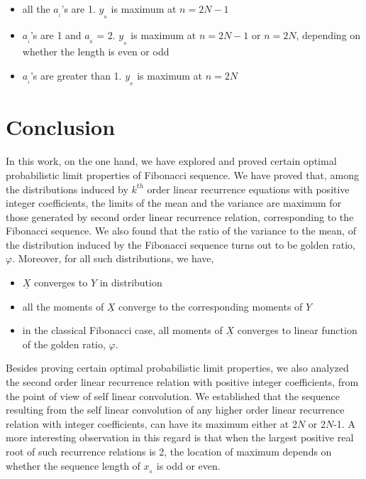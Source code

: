 \begin{multicols}{2}
\begin{itemize}
\item all the $a_{_i}$'s are 1. $y_{_n}$ is maximum at $n = 2N-1$
\item $a_{_i}$'s are 1 and $a_{_0}$ = 2. $y_{_n}$ is maximum at $n = 2N-1$ or $n = 2N$, depending on whether the length is even or odd
\item $a_{_i}$'s are greater than 1. $y_{_n}$ is maximum at $n = 2N$
\end{itemize}

\vspace{-.3cm}

\section{Conclusion}\label{section-20}
In this work, on the one hand, we have explored and proved certain optimal probabilistic limit properties of Fibonacci sequence. We have proved that, among the distributions induced by $k^{th}$ order linear recurrence equations with positive integer coefficients, the limits of the mean and the variance are maximum for those generated by second order linear recurrence relation, corresponding to the Fibonacci sequence. We also found that the ratio of the variance to the mean, of the distribution induced by the Fibonacci sequence turns out to be golden ratio, $\varphi$. Moreover, for all such distributions, we have,

\vspace{-.3cm}

\begin{itemize}
\item $\underline{X}$ converges to $Y$ in distribution
\item all the moments of $\underline{X}$ converge to the corresponding moments of $Y$
\item in the classical Fibonacci case, all moments of $\underline{X}$ converges to linear function of the golden ratio, $\varphi$.
\end{itemize}

\vspace{-.3cm}

Besides proving certain optimal probabilistic limit properties, we also analyzed the second order linear recurrence relation with positive integer coefficients, from the point of view of self linear convolution. We established that the sequence resulting from the self linear convolution of any higher order linear recurrence relation with integer coefficients, can have its maximum either at 2$N$ or 2$N$-1. A more interesting observation in this regard is that when the largest positive real root of such recurrence relations is 2, the location of maximum depends on whether the sequence length of $x_{_n}$ is odd or even.


\end{multicols}
